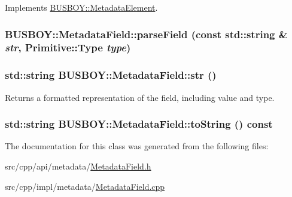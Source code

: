 Implements \hyperlink{classBUSBOY_1_1MetadataElement_ac56f20521c49259ff043c2d69bc4c08e}{BUSBOY::MetadataElement}.\hypertarget{classBUSBOY_1_1MetadataField_a35e8750c6a50b2aeac6a2e12f39e2d58}{
\subsubsection[{parseField}]{ BUSBOY::MetadataField::parseField (const std::string \& {\em str}, \/  {\bf Primitive::Type} {\em type})}}
\label{classBUSBOY_1_1MetadataField_a35e8750c6a50b2aeac6a2e12f39e2d58}
\hypertarget{classBUSBOY_1_1MetadataField_a5c6f7fb462f022c18abb53ebfecec0b6}{
\subsubsection[{str}]{\setlength{\rightskip}{0pt plus 5cm}std::string BUSBOY::MetadataField::str ()}}
\label{classBUSBOY_1_1MetadataField_a5c6f7fb462f022c18abb53ebfecec0b6}


Returns a formatted representation of the field, including value and type. \hypertarget{classBUSBOY_1_1MetadataField_aaa19cf92f05e5cc4eb8fe2802f690b7d}{
\subsubsection[{toString}]{\setlength{\rightskip}{0pt plus 5cm}std::string BUSBOY::MetadataField::toString () const}}
\label{classBUSBOY_1_1MetadataField_aaa19cf92f05e5cc4eb8fe2802f690b7d}


The documentation for this class was generated from the following files:\begin{DoxyCompactItemize}
\item 
src/cpp/api/metadata/\hyperlink{MetadataField_8h}{MetadataField.h}\item 
src/cpp/impl/metadata/\hyperlink{MetadataField_8cpp}{MetadataField.cpp}\end{DoxyCompactItemize}
